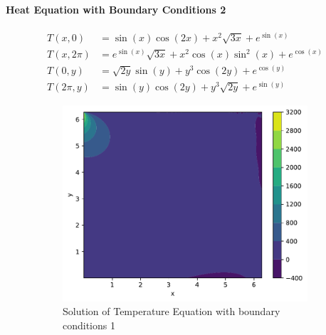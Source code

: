  \paragraph{Heat Equation with Boundary Conditions 2}
 \label{para:heat2}
\begin{align*}
    T(x, 0) &= \sin(x) \cos(2x) + x^2\sqrt{3x}  + e^{\sin(x)} \\
    T(x, 2\pi) &= e^{\sin(x)} \sqrt{3x} + x^2 \cos(x)  \sin^2(x)   + e^{\cos(x)} \\
    T(0, y) &= \sqrt{2y}  \sin(y) + y^3\cos(2y)   + e^{\cos(y)} \\
    T(2\pi, y) &= \sin(y) \cos(2y) + y^3\sqrt{2y}   + e^{\sin(y)}
\end{align*}


\begin{figure}[H]
    \centering
    \begin{subfigure}[b]{0.49\textwidth}
        \centering
        \includegraphics[width=\textwidth]{Figures/PINN-BO/heat_py_pde_1000_test_1.pdf}
        \caption{Solution of Temperature Equation with boundary conditions 1}
 \label{fig:heat_1_dist}
    \end{subfigure}
    \hfill
    \begin{subfigure}[b]{0.49\textwidth}
        \centering

\end{subfigure}
\end{figure}
